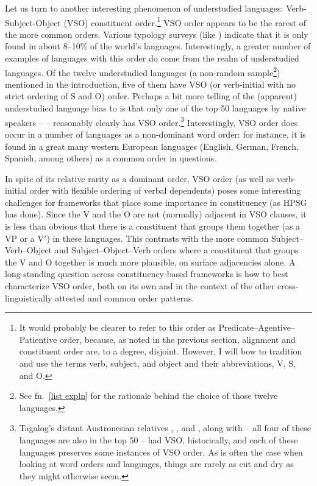 \documentclass[output=paper
                ,modfonts
                ,nonflat
	        ,collection
	        ,collectionchapter
	        ,collectiontoclongg
 	        ,biblatex
                ,babelshorthands
                ,newtxmath
                ,draftmode
                ,colorlinks, citecolor=brown
]{./langsci/langscibook}
\begin{document}
{Let us turn to another interesting phenomenon of understudied languages: Verb-Subject-Object (VSO) constituent order.\footnote{It would probably be clearer to refer to this order as Predicate--Agentive--Patientive order, because, as noted in the previous section, alignment and constituent order are, to a degree, disjoint. However, I will bow to tradition and use the terms verb, subject, and object and their abbreviations, V, S, and O.} VSO order appears to be the rarest of the more common orders. Various typology surveys (like \citealt{dryerWALSwordorder}) indicate that it is only found in about 8--10\% of the world's languages. Interestingly, a greater number of examples of languages with this order do come from the realm of understudied languages. Of the twelve understudied languages (a non-random sample\footnote{See fn.\ \ref{list expln} for the rationale behind the choice of those twelve languages.}) mentioned in the introduction, five of them have VSO (or verb-initial with no strict ordering of S and O) order. Perhaps a bit more telling of the (apparent) understudied language bias to  is that only one of the top 50 languages by native speakers --  -- reasonably clearly has VSO order.\footnote{Tagalog's distant Austronesian relatives , , and , along with  -- all four of these languages are also in the top 50 -- had VSO, historically, and each of these languages preserves some instances of VSO order. As is often the case when looking at word orders and languages, things are rarely as cut and dry as they might otherwise seem.} Interestingly, VSO order does occur in a number of languages as a non-dominant word order: for instance, it is found in a great many western European languages (English, German, French, Spanish, among others) as a common order in questions. 

In spite of its relative rarity as a dominant order, VSO order (as well as verb-initial order with flexible ordering of verbal dependents) poses some interesting challenges for frameworks that place some importance in constituency (as HPSG has done). Since the V and the O are not (normally) adjacent in VSO clauses, it is less than obvious that there is a constituent that groups them together (as a VP or a V$'$) in these languages. This contrasts with the more common Subject--Verb--Object and Subject--Object--Verb orders where a constituent that groups the V and O together is much more plausible, on surface adjacencies alone. A long-standing question across constituency-based frameworks is how to best characterize VSO order, both on its own and in the context of the other cross-linguistically attested and common order patterns.  

}
\end{document}
